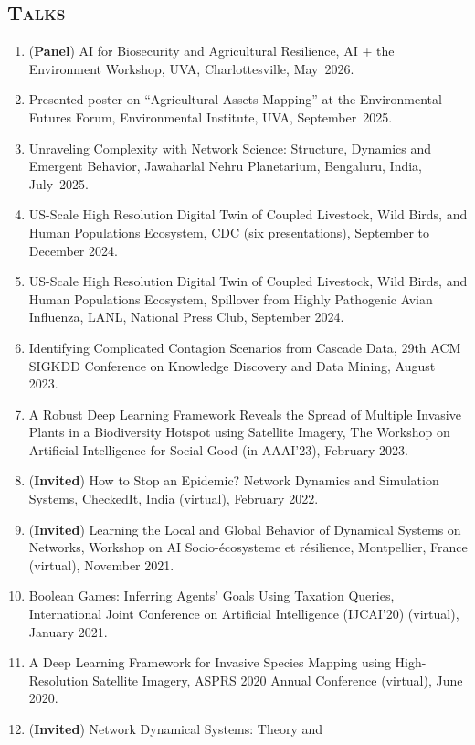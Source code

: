 \documentclass[margin,10pt]{res}
\begin{document}
\begin{resume}
\section{\textnormal{\textsc{Talks}}} 
\begin{enumerate}[1.]
\item (\textbf{Panel}) AI for Biosecurity and Agricultural Resilience, AI + the Environment Workshop, UVA, Charlottesville, May~2026.
\item Presented poster on ``Agricultural Assets Mapping''
at the Environmental Futures Forum, Environmental Institute, UVA, September~2025.
\item Unraveling Complexity with Network Science: Structure, Dynamics and
Emergent Behavior, Jawaharlal Nehru Planetarium, Bengaluru, India, July~2025.
\item US-Scale High Resolution Digital Twin of Coupled Livestock, Wild
Birds, and Human Populations Ecosystem, CDC (six presentations), September
to December 2024.
\item US-Scale High Resolution Digital Twin of Coupled Livestock, Wild
Birds, and Human Populations Ecosystem, Spillover from Highly Pathogenic
Avian Influenza, LANL, National Press Club, September 2024.
\item Identifying Complicated Contagion Scenarios from Cascade Data, 29th
ACM SIGKDD Conference on Knowledge Discovery and Data Mining, August
2023.
\item A Robust Deep Learning Framework Reveals the Spread of Multiple
Invasive Plants in a Biodiversity Hotspot using Satellite Imagery, The
Workshop on Artificial Intelligence for Social Good (in AAAI'23), February
2023.
\item (\textbf{Invited}) How to Stop an Epidemic? Network Dynamics and
Simulation Systems, CheckedIt, India (virtual), February 2022.
\item (\textbf{Invited}) Learning the Local and Global Behavior of
Dynamical Systems on Networks, Workshop on AI Socio-\'{e}cosysteme et
r\'{e}silience, Montpellier, France (virtual), November 2021.
\item Boolean Games: Inferring Agents' Goals Using Taxation Queries,
International Joint Conference on Artificial Intelligence (IJCAI'20)
(virtual), January 2021.
\item A Deep Learning Framework for Invasive Species Mapping using
High-Resolution Satellite Imagery, ASPRS 2020 Annual Conference (virtual), June 2020.
\item (\textbf{Invited}) Network Dynamical Systems: Theory and

\end{enumerate}
\end{resume}
\end{document}
